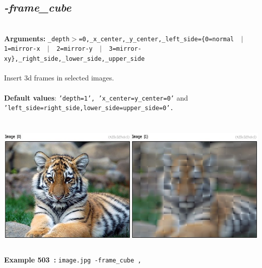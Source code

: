 \documentclass[a4paper,11pt,twoside]{book}
\begin{document}
\subsection{\emph{-frame\_cube} }\vspace*{-0.5em}
~\\\textbf{Arguments: } 
{\small \texttt{\_depth$>$=0,\_x\_center,\_y\_center,\_left\_side=\{0=normal ~$|$~ 1=mirror-x ~$|$~ 2=mirror-y ~$|$~ 3=mirror-xy\},\_right\_side,\_lower\_side,\_upper\_side}}\\~\\
Insert 3d frames in selected images.
~\\~\\\textbf{Default values}: {\small \texttt{'depth=1', 'x\_center=y\_center=0'} and \texttt{'left\_side=right\_side,lower\_side=upper\_side=0'.}}
\begin{center}\includegraphics[keepaspectratio=true,height=7cm,width=\textwidth]{img/gmic_def503.jpg}\\
{\footnotesize \textbf{Example 503~:} \texttt{image.jpg -frame\_cube ,}}
\end{center}
\end{document}
